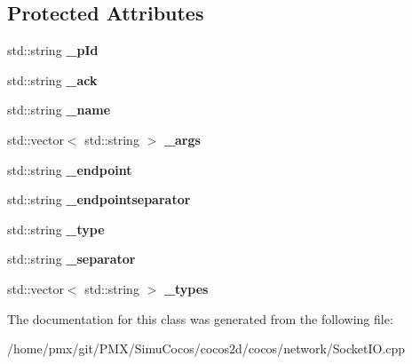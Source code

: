 \subsection*{Protected Attributes}
\begin{DoxyCompactItemize}
\item 
\mbox{\label{classnetwork_1_1SocketIOPacket_ac6560067866df80f7e4c0c9ea644fa27}} 
std\+::string {\bfseries \+\_\+p\+Id}
\item 
\mbox{\label{classnetwork_1_1SocketIOPacket_a6ee692f5881c2749051c20e9a1a08932}} 
std\+::string {\bfseries \+\_\+ack}
\item 
\mbox{\label{classnetwork_1_1SocketIOPacket_aafe64091ef4aff9e3854b65d620ddb3d}} 
std\+::string {\bfseries \+\_\+name}
\item 
\mbox{\label{classnetwork_1_1SocketIOPacket_a216e31c4cf1b146d387cfac12226c8ed}} 
std\+::vector$<$ std\+::string $>$ {\bfseries \+\_\+args}
\item 
\mbox{\label{classnetwork_1_1SocketIOPacket_afc6078ae7f1fca6a8b195ad205eb7df2}} 
std\+::string {\bfseries \+\_\+endpoint}
\item 
\mbox{\label{classnetwork_1_1SocketIOPacket_a3008e5efb1e1c943bcec2a133da700c7}} 
std\+::string {\bfseries \+\_\+endpointseparator}
\item 
\mbox{\label{classnetwork_1_1SocketIOPacket_a49ff30f0d7ef04df329cee4f405eb45f}} 
std\+::string {\bfseries \+\_\+type}
\item 
\mbox{\label{classnetwork_1_1SocketIOPacket_afd7b604de1adaa822dd41ce2b2be94c0}} 
std\+::string {\bfseries \+\_\+separator}
\item 
\mbox{\label{classnetwork_1_1SocketIOPacket_af0649a8ac8b53baee3debc1d092643a6}} 
std\+::vector$<$ std\+::string $>$ {\bfseries \+\_\+types}
\end{DoxyCompactItemize}


The documentation for this class was generated from the following file\+:\begin{DoxyCompactItemize}
\item 
/home/pmx/git/\+P\+M\+X/\+Simu\+Cocos/cocos2d/cocos/network/Socket\+I\+O.\+cpp\end{DoxyCompactItemize}
